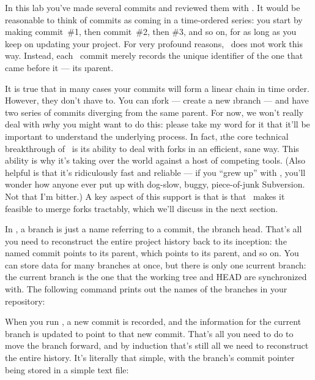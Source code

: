 \documentclass[letterpaper,12pt,titlepage,twoside]{article}
\begin{document}
In this lab you've made several commits and reviewed them with . It
would be reasonable to think of commits as coming in a time-ordered series:
you start by making commit~\#1, then commit~\#2, then \#3, and so on, for as
long as you keep on updating your project. For very profound reasons,
\git\ does \i{not} work this way. Instead, each \git\ commit merely records
the unique identifier of the one that came before it --- its \i{parent}.


It is true that in many cases your commits will form a linear chain in time
order. However, they don't \i{have} to. You can \i{fork} --- create a new
\i{branch} --- and have two series of commits diverging from the same parent.
For now, we won't really deal with \i{why} you might want to do this: please
take my word for it that it'll be important to understand the underlying
process. In fact, \i{the core technical breakthrough of \git\ is its ability
  to deal with forks in an efficient, sane way.} This ability is why it's
taking over the world against a host of competing tools. (Also helpful is that
it's ridiculously fast and reliable --- if you ``grew up'' with \git, you'll
wonder how anyone ever put up with dog-slow, buggy, piece-of-junk Subversion.
Not that I'm bitter.) A key aspect of this support is that is that \git\ makes
it feasible to \i{merge} forks tractably, which we'll discuss in the next
section.

In \git, a branch is just a name referring to a commit, the \i{branch head}.
That's all you need to reconstruct the entire project history back to its
inception: the named commit points to its parent, which points to its parent,
and so on. You can store data for many branches at once, but there is only one
\i{current branch}: the current branch is the one that the working tree and
HEAD are synchronized with. The following command prints out the names of the
branches in your repository:



When you run , a new commit is recorded, and the information for
the current branch is updated to point to that new commit. That's all you need
to do to move the branch forward, and by induction that's still all we need to
reconstruct the entire history. It's literally that simple, with the branch's
commit pointer being stored in a simple text file:
\end{document}
